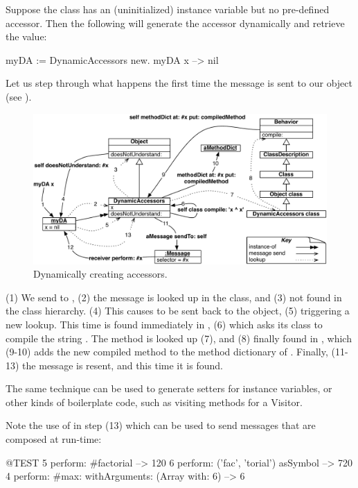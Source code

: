 \documentclass[a4paper,10pt,twoside]{book}
\begin{document}
Suppose the class  has an (uninitialized) instance variable  but no pre-defined accessor. Then the following will generate the accessor dynamically and retrieve the value:
\begin{code}{}
myDA := DynamicAccessors new.
myDA x --> nil
\end{code}

Let us step through what happens the first time the message  is sent to our object (see ).

\begin{figure}[ht]\centering
        \includegraphics[width=\linewidth]{DynamicAccessors}
        \caption{Dynamically creating accessors.}
\end{figure}

(1) We send  to , (2) the message is looked up in the class, and (3) not found in the class hierarchy. (4) This causes  to be sent back to the object, (5) triggering a new lookup. This time  is found immediately in , (6) which asks its class to compile the string . The  method is looked up (7), and (8) finally found in , which (9-10) adds the new compiled method to the method dictionary of . Finally, (11-13) the message is resent, and this time it is found.

The same technique can be used to generate setters for instance variables, or other kinds of boilerplate code, such as visiting methods for a Visitor.

Note the use of  in step (13) which can be used to send messages that are composed at run-time:
\begin{code}{@TEST}
5 perform: #factorial                                             --> 120
6 perform: ('fac', 'torial') asSymbol                       --> 720
4 perform: #max: withArguments: (Array with: 6) --> 6
\end{code}
\end{document}
